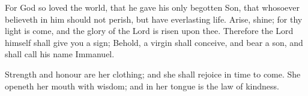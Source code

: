 \begin{multicols}{2}
	For God so loved the world, that he gave his only begotten Son, that whosoever believeth in him should not perish, but have everlasting life. 
	Arise, shine; for thy light is come, and the glory of the Lord is risen upon thee. 
	Therefore the Lord himself shall give you a sign; Behold, a virgin shall conceive, and bear a son, and shall call his name Immanuel. 
	\par
	Strength and honour are her clothing; and she shall rejoice in time to come. She openeth her mouth with wisdom; and in her tongue is the law of kindness. 

\end{multicols}
